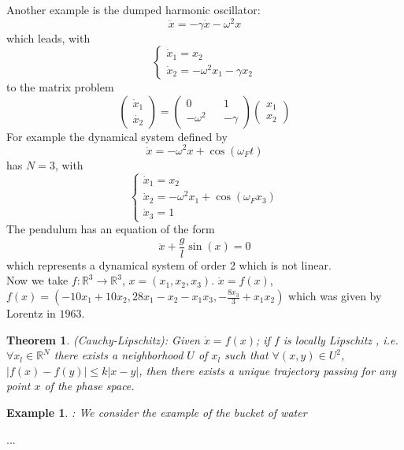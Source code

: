 \documentclass[10pt,a4paper]{book}
\newtheorem{thm}{Theorem}
\newtheorem{ex}{Example}
\begin{document}
Another example is the dumped harmonic oscillator:
$$\ddot{x}=-\gamma\dot{x}-\omega^2 x$$ which leads, with 
$$\begin{cases}
\dot{x}_1=x_2\\
\dot{x}_2=-\omega^2 x_1-\gamma x_2
\end{cases}$$ to the matrix problem
$$\begin{pmatrix}
\dot{x}_1\\
\dot{x_2}
\end{pmatrix}=
\begin{pmatrix}
0 && 1\\
-\omega^2 && -\gamma
\end{pmatrix}
\begin{pmatrix}
x_1\\
x_2
\end{pmatrix}$$
For example the dynamical system defined by 
$$\ddot{x}=-\omega^2 x+\cos(\omega_F t)$$
has $N=3$, with 
$$\begin{cases}
\dot{x}_1=x_2\\
\dot{x}_2=-\omega^2 x_1+\cos(\omega_F x_3)\\
\dot{x}_3=1
\end{cases}$$
The pendulum has an equation of the form 
$$\ddot{x}+\frac{g}{l}\sin(x)=0$$ which represents a dynamical system of order 2 which is not linear.\\
Now we take $f:\mathbb{R}^3\to\mathbb{R}^3$, $x=(x_1,x_2,x_3)$. $\dot{x}=f(x)$, $f(x)=(-10x_1+10x_2,28x_1-x_2-x_1x_3,-\frac{8x_3}{3}+x_1x_2)$ which was given by Lorentz in $1963$.

\begin{thm}
 (Cauchy-Lipschitz):
Given $\dot{x}=f(x)$; if $f$ is locally Lipschitz , i.e.
$\forall x_l\in\mathbb{R}^N$ there exists a neighborhood $U$ of $x_l$ such that 
$\forall(x,y)\in U^2$, $|f(x)-f(y)|\leq k|x-y|$, then there exists a unique trajectory passing for any point $x$ of the phase space.

\end{thm}


\begin{ex}:
We consider the example of the bucket of water\end{ex}
...\\
\end{document}
